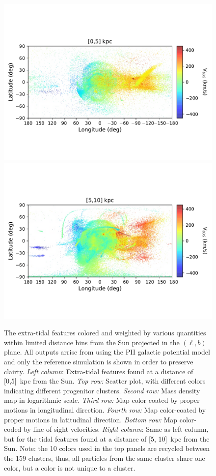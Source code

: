 \begin{figure}[h!]
\begin{center}
            \includegraphics[clip=true, trim = 0mm 20mm 0mm 20mm, width=0.9\columnwidth]{images/PII_ensemble_LB_D0-5_RV_new.pdf}
            \includegraphics[clip=true, trim = 0mm 20mm 0mm 20mm, width=0.9\columnwidth]{images/PII_ensemble_LB_D5-10_RV_new.pdf}
        \end{center}
        \caption{The extra-tidal features colored and weighted by various quantities within limited distance bins from the Sun projected in the $(\ell, b)$ plane. All outputs arrise from using the PII galactic potential model and only the reference simulation is shown in order to preserve clairty. \emph{Left column}: Extra-tidal features found at a distance of [0,5]~kpc from the Sun. \emph{Top row:} Scatter plot, with different colors indicating different progenitor clusters. \emph{Second row:} Mass density map in logarithmic scale. \emph{Third row:} Map color-coated by proper motions in longitudinal direction.    \emph{Fourth row:} Map color-coated by proper motions in latitudinal direction.  \emph{Bottom row:} Map color-coded by line-of-sight velocities. \emph{Right column}: Same as left column, but for the tidal features found at a distance of [5, 10]~kpc from the Sun. Note: the 10 colors used in the top panels are recycled between the 159 clusters, thus, all particles from the same cluster share one color, but a color is not unique to a cluster. }\label{D0-10}
    \end{figure}
    \onecolumn


